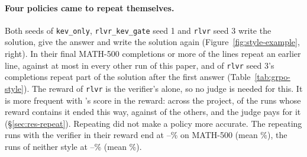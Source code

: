 \begin{table}[t]
\centering\small

\caption{Training completions that open with an informal draft, per 50-step window: their share, and $\Delta$ right,
the mean over the groups that hold both kinds of the share of drafts the verifier accepts minus that of the other
completions of the group, in percentage points.}
\label{tab:grpo-draftgroups}
\end{table}

\paragraph{Four policies came to repeat themselves.} Both seeds of \texttt{kev\_only}, \texttt{rlvr\_kev\_gate} seed 1
and \texttt{rlvr} seed 3 write the solution, give the answer and write the solution again (Figure~\ref{fig:style-example},
right). In their final MATH-500 completions  or more of the lines repeat an earlier line, against at
most  in every other run of this paper, and  of \texttt{rlvr} seed 3's
completions repeat part of the solution after the first answer (Table~\ref{tab:grpo-style}). The reward of \texttt{rlvr}
is the verifier's alone, so no judge is needed for this. It is more frequent with \kev{}'s score in the reward: across
the project,  of the  runs whose reward contains it ended this way, against
 of the  others, and the judge pays for it (\S\ref{sec:res-repeat}). Repeating did
not make a policy more accurate. The repeating runs with the verifier in their reward end at
--\% on MATH-500 (mean \%), the runs of neither
style at --\% (mean \%).

\begin{table}[t]
\centering\small
\setlength{\tabcolsep}{4.5pt}

\caption{What each final policy writes on MATH-500 (greedy): completion tokens, share truncated at 2048 tokens, share of
lines (of at least 20 characters) that repeat an earlier line of the same completion, share of completions that repeat
such a line after their first boxed answer, share with more than one boxed answer (the verifier reads the last one),
share that open with an informal draft, and \kev{}'s $\pc$ for right and for wrong answers.}
\label{tab:grpo-style}
\end{table}

